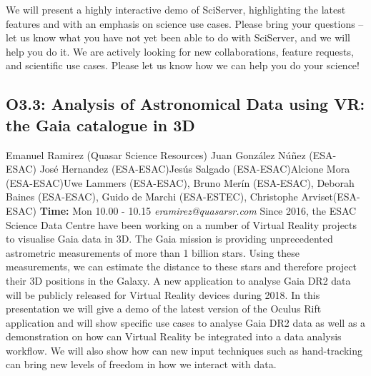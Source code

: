 \documentclass{report}
\begin{document}
We will present a highly interactive demo of SciServer, highlighting the latest features and with an emphasis on science use cases. Please bring your questions – let us know what you have not yet been able to do with SciServer, and we will help you do it. We are actively looking for new collaborations, feature requests, and scientific use cases. Please let us know how we can help you do your science!\newline
\newpage
\subsection*{O3.3: Analysis of Astronomical Data using VR: the Gaia catalogue in 3D}
\bigskip
Emanuel Ramirez (Quasar Science Resources) \newline Juan González Núñez (ESA-ESAC) \newline  José Hernandez (ESA-ESAC)\newline  Jesús Salgado (ESA-ESAC)\newline Alcione Mora (ESA-ESAC)\newline  Uwe Lammers (ESA-ESAC),
Bruno Merín (ESA-ESAC), 
Deborah Baines (ESA-ESAC),
Guido de Marchi (ESA-ESTEC),
Christophe Arviset(ESA-ESAC)\newline\newline
{\bf Time:} Mon 10.00 - 10.15\newline
\newline
{\it eramirez@quasarsr.com}\newline
\newline\newline
Since 2016, the ESAC Science Data Centre have been working on a number of Virtual Reality projects to visualise Gaia data in 3D. The Gaia mission is providing unprecedented astrometric measurements of more than 1 billion stars. Using these measurements, we can estimate the distance to these stars and therefore project their 3D positions in the Galaxy. A new application to analyse Gaia DR2 data will be publicly released for Virtual Reality devices during 2018. In this presentation we will give a demo of the latest version of the Oculus Rift application and will show specific use cases to analyse Gaia DR2 data as well as a demonstration on how can Virtual Reality be integrated into a data analysis workflow.
We will also show how can new input techniques such as hand-tracking can bring new levels of freedom in how we interact with data.\newline
\newpage
\end{document}
